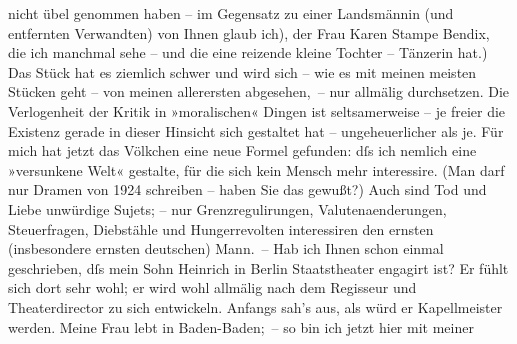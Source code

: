 \begin{ledgroupsized}[t]{13cm}
               nicht übel genommen haben – \label{T_L02423-1v}\label{T_L02423-1h}im
               Gegensatz zu einer Landsmännin (und entfernten Verwandten) von Ihnen glaub ich), der
               Frau Karen Stampe Bendix, die ich manchmal sehe
               – und die eine reizende kleine Tochter – Tänzerin hat.) Das Stück hat es ziemlich schwer und wird sich – wie es mit
               meinen meisten Stücken geht – von meinen allerersten abgesehen, – nur allmälig
               durchsetzen. Die Verlogenheit der Kritik in »moralischen« Dingen ist seltsamerweise –
               je freier die Existenz gerade in dieser Hinsicht sich gestaltet hat – ungeheuerlicher
               als je. Für mich hat jetzt das Völkchen eine neue Formel gefunden: dſs ich nemlich
               eine »versunkene Welt« gestalte, für die sich kein Mensch mehr interessire. (Man darf
               nur Dramen von 1924 schreiben – haben Sie das gewußt?) Auch sind Tod und
               Liebe unwürdige Sujets; – nur Grenzregulirungen, Valutenaenderungen, Steuerfragen,
               Diebstähle und Hungerrevolten interessiren den {\pb}ernsten (insbesondere ernsten deutschen) Mann. –\pend
           \pstart
           Hab ich Ihnen schon einmal geschrieben, dſs mein Sohn Heinrich in Berlin
                  Staatstheater engagirt ist? Er fühlt sich dort sehr wohl; er wird wohl
               allmälig nach dem Regisseur und Theaterdirector zu sich entwickeln. Anfangs sah's
               aus, als würd er Kapellmeister werden.\pend
           \pstart
           Meine Frau lebt in Baden-Baden; – so bin ich jetzt hier mit meiner

\end{ledgroupsized}
